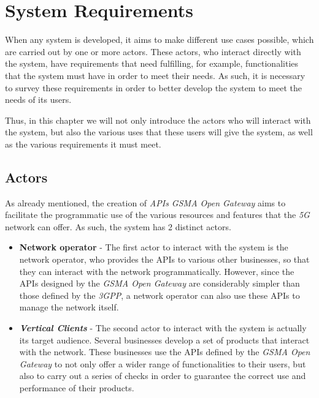 \chapter{System Requirements}

When any system is developed, it aims to make different use cases possible,
which are carried out by one or more actors. These actors, who interact
directly with the system, have requirements that need fulfilling, for example,
functionalities that the system must have in order to meet their needs. As
such, it is necessary to survey these requirements in order to better develop
the system to meet the needs of its users.

Thus, in this chapter we will not only introduce the actors who will interact
with the system, but also the various uses that these users will give the
system, as well as the various requirements it must meet.

\section{Actors}

As already mentioned, the creation of \emph{APIs GSMA Open Gateway} aims to
facilitate the programmatic use of the various resources and features that the
\emph{5G} network can offer. As such, the system has 2 distinct actors.
\begin{itemize}
	\item \textbf{Network operator} - The first actor to interact with the system
	      is the network operator, who provides the APIs to various other businesses,
	      so that they can interact with the network programmatically. However, since
	      the APIs designed by the \emph{GSMA Open Gateway} are considerably simpler
	      than those defined by the \emph{3GPP}, a network operator can also use
	      these APIs to manage the network itself.

	\item \textbf{\emph{Vertical Clients}}\cite{5g-ppp} - The second actor to
	      interact with the system is actually its target audience. Several
	      businesses develop a set of products that interact with the network. These
	      businesses use the APIs defined by the \emph{GSMA Open Gateway} to not only
	      offer a wider range of functionalities to their users, but also to carry
	      out a series of checks in order to guarantee the correct use and
	      performance of their products.
\end{itemize}

